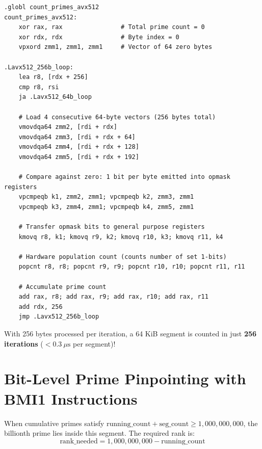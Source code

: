 \documentclass[11pt,a4paper]{article}
\begin{document}
\begin{lstlisting}[language={[x86masm]Assembler}, caption={4-Way Unrolled AVX-512 Zero Counting Kernel in sieve\_kernel.s}]
.globl count_primes_avx512
count_primes_avx512:
    xor rax, rax                # Total prime count = 0
    xor rdx, rdx                # Byte index = 0
    vpxord zmm1, zmm1, zmm1     # Vector of 64 zero bytes

.Lavx512_256b_loop:
    lea r8, [rdx + 256]
    cmp r8, rsi
    ja .Lavx512_64b_loop

    # Load 4 consecutive 64-byte vectors (256 bytes total)
    vmovdqa64 zmm2, [rdi + rdx]
    vmovdqa64 zmm3, [rdi + rdx + 64]
    vmovdqa64 zmm4, [rdi + rdx + 128]
    vmovdqa64 zmm5, [rdi + rdx + 192]

    # Compare against zero: 1 bit per byte emitted into opmask registers
    vpcmpeqb k1, zmm2, zmm1; vpcmpeqb k2, zmm3, zmm1
    vpcmpeqb k3, zmm4, zmm1; vpcmpeqb k4, zmm5, zmm1

    # Transfer opmask bits to general purpose registers
    kmovq r8, k1; kmovq r9, k2; kmovq r10, k3; kmovq r11, k4

    # Hardware population count (counts number of set 1-bits)
    popcnt r8, r8; popcnt r9, r9; popcnt r10, r10; popcnt r11, r11

    # Accumulate prime count
    add rax, r8; add rax, r9; add rax, r10; add rax, r11
    add rdx, 256
    jmp .Lavx512_256b_loop
\end{lstlisting}

With 256 bytes processed per iteration, a 64 KiB segment is counted in just \textbf{256 iterations} ($< 0.3 \ \mu\text{s}$ per segment)!

\newpage

\section{Bit-Level Prime Pinpointing with BMI1 Instructions}

When cumulative primes satisfy $\text{running\_count} + \text{seg\_count} \ge 1,000,000,000$, the billionth prime lies inside this segment. The required rank is:
\begin{equation}
    \text{rank\_needed} = 1,000,000,000 - \text{running\_count}
\end{equation}
\end{document}
